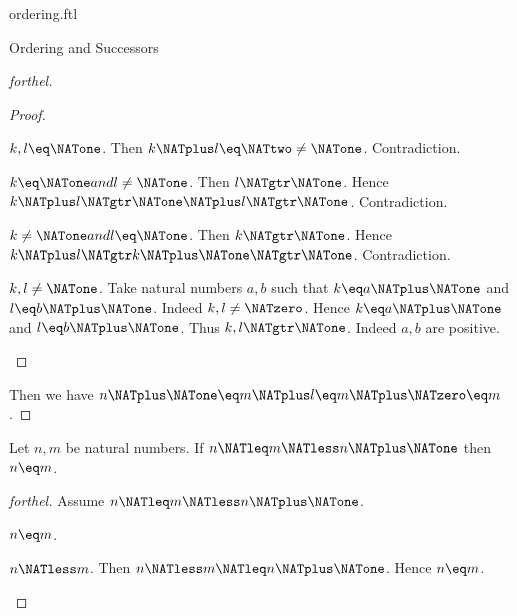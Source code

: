 \documentclass{naproche-library}
\begin{document}
\begin{smodule}[title=The Standard Ordering of the Natural Numbers]{ordering.ftl}
\begin{sfragment}{Ordering and Successors}
\begin{proof}[forthel]
\begin{proof}
      \begin{case}{$k,l \eq \NATone$.}
        Then $k \NATplus l
          \eq \NATtwo
          \neq \NATone$.
        Contradiction.
      \end{case}

      \begin{case}{$k \eq \NATone and l \neq \NATone$.}
        Then $l \NATgtr \NATone$.
        Hence $k \NATplus l
          \NATgtr \NATone \NATplus l
          \NATgtr \NATone$.
        Contradiction.
      \end{case}

      \begin{case}{$k \neq \NATone and l \eq \NATone$.}
        Then $k \NATgtr \NATone$.
        Hence $k \NATplus l
          \NATgtr k \NATplus \NATone
          \NATgtr \NATone$.
        Contradiction.
      \end{case}

      \begin{case}{$k, l \neq \NATone$.}
        Take natural numbers $a, b$ such that $k \eq a \NATplus \NATone$ and $l \eq b \NATplus \NATone$.
        Indeed $k, l \neq \NATzero$.
        Hence $k \eq a \NATplus \NATone$ and $l \eq b \NATplus \NATone$.
        Thus $k, l \NATgtr \NATone$. Indeed $a, b$ are positive.
      \end{case}
    \end{proof}

    Then we have $n \NATplus \NATone
      \eq m \NATplus l
      \eq m \NATplus \NATzero
      \eq m$.
  \end{proof}

  \begin{proposition}[forthel,id=ARITHMETIC_04_8792330561650688]
    Let $n, m$ be natural numbers.
    If $n \NATleq m \NATless n \NATplus \NATone$ then $n \eq m$.
  \end{proposition}
  \begin{proof}[forthel]
    Assume $n \NATleq m \NATless n \NATplus \NATone$.

    \begin{case}{$n \eq m$.} \end{case}

    \begin{case}{$n \NATless m$.}
      Then $n \NATless m \NATleq n \NATplus \NATone$.
      Hence $n \eq m$.
    \end{case}
  \end{proof}


\end{sfragment}
\end{smodule}
\end{document}
